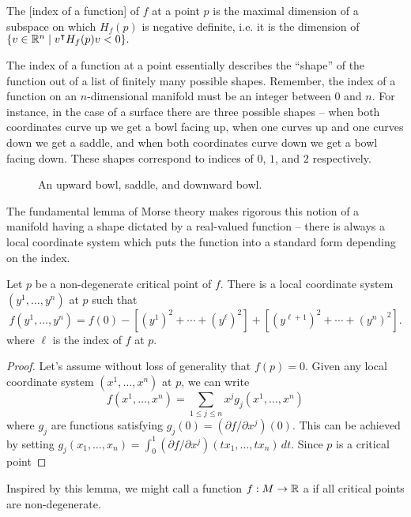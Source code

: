 \begin{definition}
	The [index of a function] of $f$ at a point $p$ is the maximal dimension of a subspace on which $H_f(p)$ is negative definite, i.e. it is the dimension of $\{v\in \mathbb{R}^n \mid v^\intercal H_f(p) v < 0\}.$
\end{definition}

The index of a function at a point essentially describes the ``shape'' of the function out of a list of finitely many possible shapes. Remember, the index of a function on an $n$-dimensional manifold must be an integer between $0$ and $n$. For instance, in the case of a surface there are three possible shapes -- when both coordinates curve up we get a bowl facing up, when one curves up and one curves down we get a saddle, and when both coordinates curve down we get a bowl facing down. These shapes correspond to indices of $0$, $1$, and $2$ respectively.
\begin{figure}[ht]
	\centering
	\medskip
	\caption{An upward bowl, saddle, and downward bowl.}
\end{figure}

The fundamental lemma of Morse theory makes rigorous this notion of a manifold having a shape dictated by a real-valued function -- there is always a local coordinate system which puts the function into a standard form depending on the index.

\begin{lemma}\label{lemma:morse}
	Let $p$ be a non-degenerate critical point of $f$. There is a local coordinate system $(y^1,\ldots, y^n)$ at $p$ such that
	\[
		f(y^1,\ldots, y^n)=f(0)-\left[(y^1)^2 + \cdots + (y^{\ell})^2\right] + \left[(y^{\ell + 1})^2 + \cdots + (y^n)^2\right].
	\]
	where $\ell$ is the index of $f$ at $p$.
\end{lemma}
\begin{proof}
	Let's assume without loss of generality that $f(p)=0$. Given any local coordinate system $(x^1,\ldots, x^n)$ at $p$, we can write
	\[
		f(x^1,\ldots, x^n) = \sum_{1\leq j \leq n} x^j g_j(x^1,\ldots, x^n)
	\]
	where $g_j$ are functions satisfying $g_j(0)=(\partial f / \partial x^j)(0)$. 
	This can be achieved by setting $g_j(x_1,\ldots, x_n) = \int_0^1 (\partial f/\partial x^j)(tx_1, \ldots, tx_n)\,dt$. Since $p$ is a critical point

\end{proof}

Inspired by this lemma, we might call a function $f : M \to \mathbb{R}$ a  if all critical points are non-degenerate.

